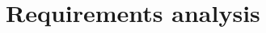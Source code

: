 \documentclass[12pt,a4paper,twoside,openright]{report}
\begin{document}

\section{Requirements analysis}\label{secreq}
\end{document}
